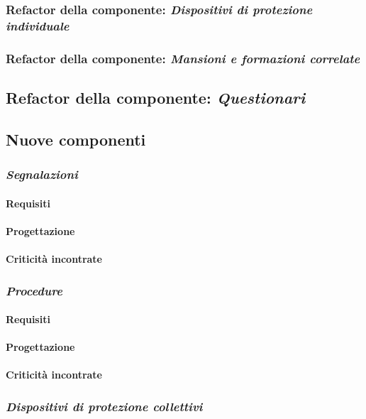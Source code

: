 \subsubsection{Refactor della componente: \textit{Dispositivi di protezione individuale}}
\subsubsection{Refactor della componente: \textit{Mansioni e formazioni correlate}}
\subsection{Refactor della componente: \textit{Questionari}}


\subsection{Nuove componenti}
\subsubsection{\textit{Segnalazioni}}
	\paragraph{Requisiti}
	\paragraph{Progettazione}
	\paragraph{Criticità incontrate}
\subsubsection{\textit{Procedure}}
	\paragraph{Requisiti}
	\paragraph{Progettazione}
	\paragraph{Criticità incontrate}
\subsubsection{\textit{Dispositivi di protezione collettivi}}
